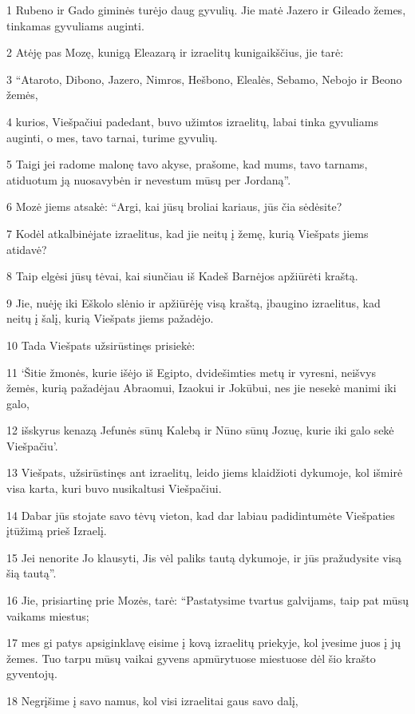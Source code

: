 \par 1 Rubeno ir Gado giminės turėjo daug gyvulių. Jie matė Jazero ir Gileado žemes, tinkamas gyvuliams auginti. 
\par 2 Atėję pas Mozę, kunigą Eleazarą ir izraelitų kunigaikščius, jie tarė: 
\par 3 “Ataroto, Dibono, Jazero, Nimros, Hešbono, Elealės, Sebamo, Nebojo ir Beono žemės, 
\par 4 kurios, Viešpačiui padedant, buvo užimtos izraelitų, labai tinka gyvuliams auginti, o mes, tavo tarnai, turime gyvulių. 
\par 5 Taigi jei radome malonę tavo akyse, prašome, kad mums, tavo tarnams, atiduotum ją nuosavybėn ir nevestum mūsų per Jordaną”. 
\par 6 Mozė jiems atsakė: “Argi, kai jūsų broliai kariaus, jūs čia sėdėsite? 
\par 7 Kodėl atkalbinėjate izraelitus, kad jie neitų į žemę, kurią Viešpats jiems atidavė? 
\par 8 Taip elgėsi jūsų tėvai, kai siunčiau iš Kadeš Barnėjos apžiūrėti kraštą. 
\par 9 Jie, nuėję iki Eškolo slėnio ir apžiūrėję visą kraštą, įbaugino izraelitus, kad neitų į šalį, kurią Viešpats jiems pažadėjo. 
\par 10 Tada Viešpats užsirūstinęs prisiekė: 
\par 11 ‘Šitie žmonės, kurie išėjo iš Egipto, dvidešimties metų ir vyresni, neišvys žemės, kurią pažadėjau Abraomui, Izaokui ir Jokūbui, nes jie nesekė manimi iki galo, 
\par 12 išskyrus kenazą Jefunės sūnų Kalebą ir Nūno sūnų Jozuę, kurie iki galo sekė Viešpačiu’. 
\par 13 Viešpats, užsirūstinęs ant izraelitų, leido jiems klaidžioti dykumoje, kol išmirė visa karta, kuri buvo nusikaltusi Viešpačiui. 
\par 14 Dabar jūs stojate savo tėvų vieton, kad dar labiau padidintumėte Viešpaties įtūžimą prieš Izraelį. 
\par 15 Jei nenorite Jo klausyti, Jis vėl paliks tautą dykumoje, ir jūs pražudysite visą šią tautą”. 
\par 16 Jie, prisiartinę prie Mozės, tarė: “Pastatysime tvartus galvijams, taip pat mūsų vaikams miestus; 
\par 17 mes gi patys apsiginklavę eisime į kovą izraelitų priekyje, kol įvesime juos į jų žemes. Tuo tarpu mūsų vaikai gyvens apmūrytuose miestuose dėl šio krašto gyventojų. 
\par 18 Negrįšime į savo namus, kol visi izraelitai gaus savo dalį, 
